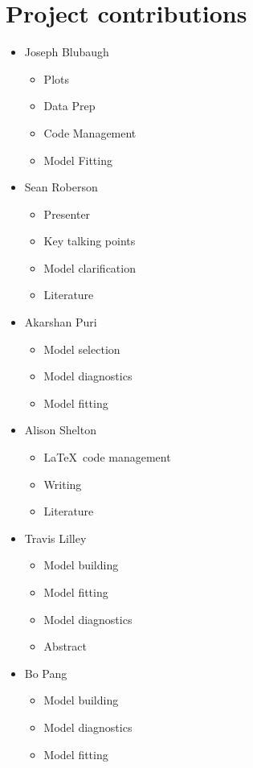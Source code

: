 \documentclass[twoside,twocolumn]{article}
\begin{document}
 \section*{Project contributions}
 \begin{itemize}
 	\item Joseph Blubaugh
 		\begin{itemize}
 			\item Plots
 			\item Data Prep
 			\item Code Management
 			\item Model Fitting
 		\end{itemize}

 	\item Sean Roberson
 	 		\begin{itemize}
 			\item Presenter
 			\item Key talking points
 			\item Model clarification
 			\item Literature
 		\end{itemize}

	\item Akarshan Puri
			\begin{itemize}
 			\item Model selection
 			\item Model diagnostics
 			\item Model fitting
 		\end{itemize}

 	\item Alison Shelton
 			\begin{itemize}
 				\item \LaTeX \ code management
 				\item Writing
 				\item Literature
 			\end{itemize}

	\item Travis Lilley
			 \begin{itemize}
			 \item Model building
			 \item Model fitting
			 \item Model diagnostics
			 \item Abstract
			 \end{itemize}

	\item{Bo Pang}
		\begin{itemize}
					\item Model building
		 			\item Model diagnostics
		 			\item Model fitting
		\end{itemize}
 \end{itemize}
\end{document}
